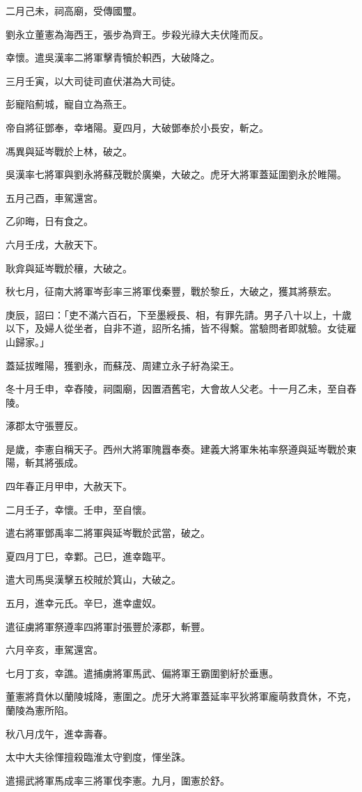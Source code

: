 \begin{pinyinscope}
二月己未，祠高廟，受傳國璽。

劉永立董憲為海西王，張步為齊王。步殺光祿大夫伏隆而反。

幸懷。遣吳漢率二將軍擊青犢於軹西，大破降之。

三月壬寅，以大司徒司直伏湛為大司徒。

彭寵陷薊城，寵自立為燕王。

帝自將征鄧奉，幸堵陽。夏四月，大破鄧奉於小長安，斬之。

馮異與延岑戰於上林，破之。

吳漢率七將軍與劉永將蘇茂戰於廣樂，大破之。虎牙大將軍蓋延圍劉永於睢陽。

五月己酉，車駕還宮。

乙卯晦，日有食之。

六月壬戌，大赦天下。

耿弇與延岑戰於穰，大破之。

秋七月，征南大將軍岑彭率三將軍伐秦豐，戰於黎丘，大破之，獲其將蔡宏。

庚辰，詔曰：「吏不滿六百石，下至墨綬長、相，有罪先請。男子八十以上，十歲以下，及婦人從坐者，自非不道，詔所名捕，皆不得繫。當驗問者即就驗。女徒雇山歸家。」

蓋延拔睢陽，獲劉永，而蘇茂、周建立永子紆為梁王。

冬十月壬申，幸舂陵，祠園廟，因置酒舊宅，大會故人父老。十一月乙未，至自舂陵。

涿郡太守張豐反。

是歲，李憲自稱天子。西州大將軍隗囂奉奏。建義大將軍朱祐率祭遵與延岑戰於東陽，斬其將張成。

四年春正月甲申，大赦天下。

二月壬子，幸懷。壬申，至自懷。

遣右將軍鄧禹率二將軍與延岑戰於武當，破之。

夏四月丁巳，幸鄴。己巳，進幸臨平。

遣大司馬吳漢擊五校賊於箕山，大破之。

五月，進幸元氏。辛巳，進幸盧奴。

遣征虜將軍祭遵率四將軍討張豐於涿郡，斬豐。

六月辛亥，車駕還宮。

七月丁亥，幸譙。遣捕虜將軍馬武、偏將軍王霸圍劉紆於垂惠。

董憲將賁休以蘭陵城降，憲圍之。虎牙大將軍蓋延率平狄將軍龐萌救賁休，不克，蘭陵為憲所陷。

秋八月戊午，進幸壽春。

太中大夫徐惲擅殺臨淮太守劉度，惲坐誅。

遣揚武將軍馬成率三將軍伐李憲。九月，圍憲於舒。


\end{pinyinscope}

